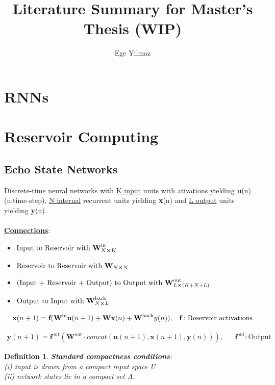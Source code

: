 \documentclass{article}
\title{Literature Summary for Master's Thesis (WIP)}
\author{ Ege Yilmaz}
\newtheorem{definition}{Definition}
\begin{document}
\maketitle
\tableofcontents

\section{RNNs}
\section{Reservoir Computing}

\subsection{Echo State Networks \cite{jäger}}
Discrete-time neural networks with
\underline{K input} units with ativations yielding \textbf{u}(n) (n:time-step), \underline{N internal} recurrent units yielding \textbf{x}(n) and \underline{L output} units yielding \textbf{y}(n). \\\\

\underline{\textbf {Connections}}:
\begin{itemize}
    \item $\text{Input to Reservoir with }\textbf{W}^{\text{in}}_{N\cross K}$
    \item $\text{Reservoir to Reservoir with }\textbf{W}_{N\cross N}$
    \item $\text{(Input + Reservoir + Output) to Output with }\textbf{W}^{\text{out}}_{L\cross (K+N+L)}$
    \item $\text{Output to Input with }\textbf{W}^{\text{back}}_{N\cross L}$
    
\end{itemize}

\begin{align}
    \textbf{x}(n+1) = \textbf{f}(\textbf{W}^{\text{in}}\textbf u(n+1) + \textbf{W}\textbf{x}(n) + \textbf{W}^\text{back} y(n)), && \textbf{f}: \text{Reservoir activations}
\end{align}

\begin{align}
    \textbf{y}(n+1) = \textbf{f}^{\text{out}}(\textbf{W}^{\text{out}} \cdot concat(\textbf{u}(n+1),\textbf{x}(n+1) ,\textbf{y}(n))), && \textbf{f}^{\text{out}}: \text{Output activations}
\end{align}

\begin{definition}
\textbf{Standard compactness conditions}: \\
(i) input is drawn from a compact input space U \\
(ii) network states lie in a compact set A.
\end{definition}
\end{document}
